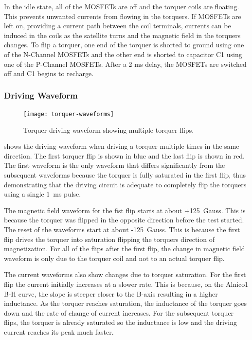 In the idle state, all of the \acp{MOSFET} are off and the torquer coils are floating. This prevents unwanted currents from flowing in the torquers. If \acp{MOSFET} are left on, providing a current path between the coil terminals, currents can be induced in the coils as the satellite turns and the magnetic field in the torquers changes. To flip a torquer, one end of the torquer is shorted to ground using one of the N-Channel \acp{MOSFET} and the other end is shorted to capacitor C1 using one of the P-Channel \acp{MOSFET}. After a 2 ms delay, the \acp{MOSFET} are switched off and C1 begins to recharge.

\subsubsection{Driving Waveform}

\begin{figure}[htb!]
    \centering
    \texttt{[image: torquer-waveforms]}
    \caption{Torquer driving waveform showing multiple torquer flips.}
    \label{fig:driveWV}
\end{figure}

 shows the driving waveform when driving a torquer multiple times in the same direction. The first torquer flip is shown in blue and the last flip is shown in red. The first waveform is the only waveform that differs significantly from the subsequent waveforms because the torquer is fully saturated in the first flip, thus demonstrating that the driving circuit is adequate to completely flip the torquers using a single 1~ms pulse.

The magnetic field waveform for the fist flip starts at about +125~Gauss. This is because the torquer was flipped in the opposite direction before the test started. The reset of the waveforms start at about -125~Gauss. This is because the first flip drives the torquer into saturation flipping the torquers direction of magnetization. For all of the flips after the first flip, the change in magnetic field waveform is only due to the torquer coil and not to an actual torquer flip.

The current waveforms also show changes due to torquer saturation. For the first flip the current initially increases at a slower rate. This is because, on the Alnico1 B-H curve, the slope is steeper closer to the B-axis resulting in a higher inductance. As the torquer reaches saturation, the inductance of the torquer goes down and the rate of change of current increases. For the subsequent torquer flips, the torquer is already saturated so the inductance is low and the driving current reaches its peak much faster.


